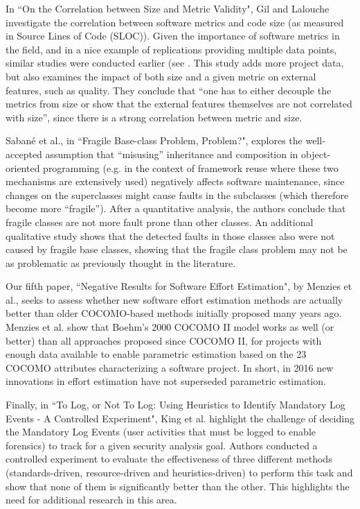 \documentclass{svjour3}                     %
\begin{document}
In ``On the Correlation between Size and Metric Validity", Gil and Lalouche investigate the correlation between software metrics and code size (as measured in Source Lines of Code (SLOC)). Given the importance of software metrics in the field,  and in a nice example of replications providing multiple data points, similar studies were conducted earlier (see \cite{shepperd,herraiz}. This study adds more project data, but also examines the impact of both size and a given metric on external features, such as quality. They conclude that ``one has to either decouple the metrics from size or show that the external features themselves are not correlated with size'', since there is a strong correlation between metric and size.

Sabané et al., in ``Fragile Base-class Problem, Problem?", explores the well-accepted assumption that ``misusing'' inheritance and composition in object-oriented programming (e.g. in the context of framework reuse where these two mechanisms are extensively used) negatively affects software maintenance, since changes on the superclasses might cause faults in the subclasses (which therefore become more ``fragile''). After a quantitative analysis, the authors conclude that fragile classes are not more fault prone than other classes. An additional qualitative study shows that the detected faults in those classes also were not caused by fragile base classes, showing that the fragile class problem may not be as problematic as previously thought in the literature.

Our fifth paper, ``Negative Results for Software Effort Estimation", by Menzies et al., seeks to assess whether new software effort estimation methods are actually better than older COCOMO-based methods initially proposed many years ago. Menzies et al. show that Boehm's 2000 COCOMO II model \cite{cocomo} works as well (or better) than all approaches proposed since COCOMO II, for projects with enough data available to enable parametric estimation based on the 23 COCOMO attributes characterizing a software project. In short, in 2016 new innovations in effort estimation have not superseded parametric estimation.

Finally, in ``To Log, or Not To Log: Using Heuristics to Identify Mandatory Log Events - A Controlled Experiment", King et al. highlight the challenge of deciding the Mandatory Log Events  (user activities that must be logged to enable forensics) to track for a given security analysis goal. Authors conducted a controlled experiment to evaluate the effectiveness of three different methods (standards-driven, resource-driven and heuristics-driven) to perform this task and show that none of them is significantly better than the other. This highlights the need for additional research in this area.
\end{document}

